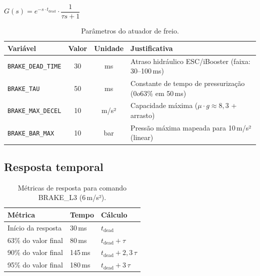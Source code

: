 \documentclass[12pt,a4paper]{article}
\newcommand{\param}[1]{\texttt{\color{laranjacode}#1}}
\begin{document}
\begin{equacaobox}
$G(s) = e^{-s \cdot t_\text{dead}} \cdot \dfrac{1}{\tau s + 1}$
\end{equacaobox}

\begin{table}[H]
  \centering
  \caption{Parâmetros do atuador de freio.}
  \begin{tabularx}{\linewidth}{lccX}
    \toprule
    \rowcolor{azulescuro!90}
    \color{white}\textbf{Variável} & \color{white}\textbf{Valor} &
    \color{white}\textbf{Unidade} & \color{white}\textbf{Justificativa} \\
    \midrule
    \param{BRAKE\_DEAD\_TIME} & 30  & ms    & Atraso hidráulico ESC/iBooster (faixa: 30--100\,ms) \\
    \rowcolor{azulclaro!50}
    \param{BRAKE\_TAU}        & 50  & ms    & Constante de tempo de pressurização (0$	o$63\% em 50\,ms) \\
    \param{BRAKE\_MAX\_DECEL} & 10  & m/s²  & Capacidade máxima ($\mu \cdot g \approx 8{,}3$ + arrasto) \\
    \rowcolor{azulclaro!50}
    \param{BRAKE\_BAR\_MAX}   & 10  & bar   & Pressão máxima mapeada para 10\,m/s² (linear) \\
    \bottomrule
  \end{tabularx}
\end{table}

\subsection{Resposta temporal}

\begin{table}[H]
  \centering
  \caption{Métricas de resposta para comando BRAKE\_L3 (6\,m/s²).}
  \begin{tabular}{lll}
    \toprule
    \rowcolor{azulescuro!90}
    \color{white}\textbf{Métrica} & \color{white}\textbf{Tempo} & \color{white}\textbf{Cálculo} \\
    \midrule
    Início da resposta & 30\,ms  & $t_\text{dead}$ \\
    \rowcolor{azulclaro!50}
    63\% do valor final & 80\,ms  & $t_\text{dead} + \tau$ \\
    90\% do valor final & 145\,ms & $t_\text{dead} + 2{,}3\,\tau$ \\
    \rowcolor{azulclaro!50}
    95\% do valor final & 180\,ms & $t_\text{dead} + 3\,\tau$ \\
    \bottomrule
  \end{tabular}
\end{table}
\end{document}
